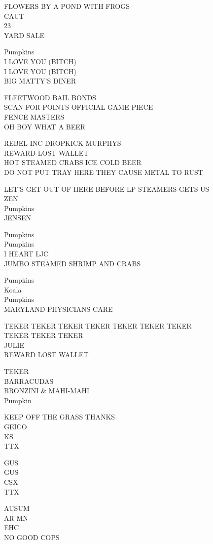 \documentclass[10pt,letterpaper]{article}
\begin{document}
FLOWERS BY A POND WITH FROGS\\
CAUT\\
23\\
YARD SALE

Pumpkins\\
I LOVE YOU (BITCH)\\
I LOVE YOU (BITCH)\\
BIG MATTY'S DINER

FLEETWOOD BAIL BONDS\\
SCAN FOR POINTS OFFICIAL GAME PIECE\\
FENCE MASTERS\\
OH BOY WHAT A BEER

REBEL INC DROPKICK MURPHYS\\
REWARD LOST WALLET\\
HOT STEAMED CRABS ICE COLD BEER\\
DO NOT PUT TRAY HERE THEY CAUSE METAL TO RUST

LET'S GET OUT OF HERE BEFORE LP STEAMERS GETS US\\
ZEN\\
Pumpkins\\
JENSEN

Pumpkins\\
Pumpkins\\
I HEART LJC\\
JUMBO STEAMED SHRIMP AND CRABS

Pumpkins\\
Koala\\
Pumpkins\\
MARYLAND PHYSICIANS CARE

TEKER TEKER TEKER TEKER TEKER TEKER TEKER\\
TEKER TEKER TEKER\\
JULIE\\
REWARD LOST WALLET

TEKER\\
BARRACUDAS\\
BRONZINI \& MAHI{-}MAHI\\
Pumpkin

KEEP OFF THE GRASS THANKS\\
GEICO\\
KS\\
TTX

GUS\\
GUS\\
CSX\\
TTX

AUSUM\\
AR MN\\
EHC\\
NO GOOD COPS
\end{document}
